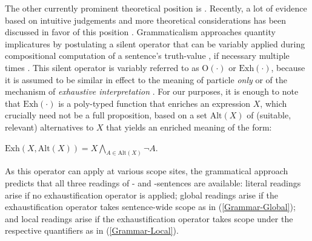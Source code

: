 \documentclass[fleqn,reqno,10pt,draft]{article}
\newcommand{\as}{\acro{as}}
\renewcommand{\es}{\acro{es}}
\newcommand{\exh}{\ensuremath{\mathrm{Exh}}}
\newcommand{\alt}{\ensuremath{\mathrm{Alt}}}
\begin{document}
The other currently prominent theoretical position is
. Recently, a lot of evidence based on
intuitive judgements and more theoretical considerations has been
discussed in favor of this position
\citep[c.f.][]{Chierchia2006:Broaden-Your-Vi,Fox2007:Free-Choice-and,Magri2011:Another-Argumen,Sauerland2012:The-Computation,ChierchiaFox2008:The-Grammatical,Chierchia2012:FC-Nominals-and}. %
Grammaticalism approaches quantity implicatures by postulating a
silent operator that can be variably applied during compositional
computation of a sentence's truth-value
\citep{Chierchia2006:Broaden-Your-Vi}, if necessary multiple times
\citep{Fox2007:Free-Choice-and}. This silent operator is variably
referred to as $\mathrm{O}(\cdot)$ or $\exh(\cdot)$, because it is
assumed to be similar in effect to the meaning of particle \emph{only}
or of the mechanism of \emph{exhaustive interpretation}
\citep{GroenendijkStokhofThesis1984,Stechowvon-StechowZimmermann1984:Term-Answers-an,Rooijvan-RooijSchulz2013:Exhaustive-Inte,vanRooijSchulz:ExhaustiveInterpretation,Fox2007:Free-Choice-and}. For
our purposes, it is enough to note that $\exh(\cdot)$ is a
poly-typed function that enriches an expression $X$, which crucially
need not be a full proposition, based on a set $\alt(X)$ of
(suitable, relevant) alternatives to $X$ that yields an enriched
meaning of the form:
\begin{exe}
  \ex \label{bsp:Exh-Def} $\exh(X,\alt(X)) = X \bigwedge_{A \in
      \alt(X)} \neg A$.
\end{exe}

As this operator can apply at various scope sites, the grammatical
approach predicts that all three readings of \as- and \es-sentences
are available: literal readings arise if no exhaustification operator
is applied; global readings arise if the exhaustification operator
takes sentence-wide scope as in (\ref{Grammar-Global}); and local
readings arise if the exhaustification operator takes scope under the
respective quantifiers as in (\ref{Grammar-Local}).
\end{document}
